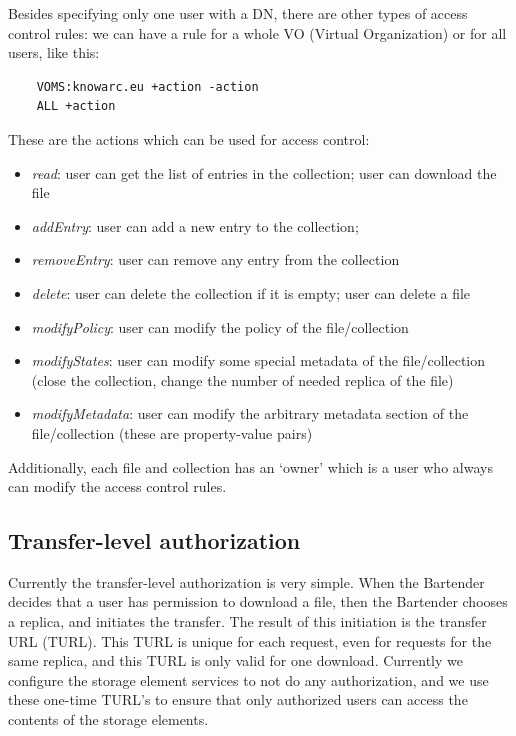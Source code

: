 \documentclass{book}
\begin{document}
Besides specifying only one user with a DN, there are other types of access control rules: we can have a rule for a whole VO (Virtual Organization) or for all users, like this:

\begin{verbatim}
    VOMS:knowarc.eu +action -action 
    ALL +action
\end{verbatim}

These are the actions which can be used for access control:
\begin{itemize}
    \item \emph{read}: user can get the list of entries in the collection; user can download the file
    \item \emph{addEntry}: user can add a new entry to the collection;
    \item \emph{removeEntry}: user can remove any entry from the collection 
    \item \emph{delete}: user can delete the collection if it is empty; user can delete a file
    \item \emph{modifyPolicy}: user can modify the policy of the file/collection
    \item \emph{modifyStates}: user can modify some special metadata of the file/collection (close the collection, change the number of needed replica of the file)
    \item \emph{modifyMetadata}: user can modify the arbitrary metadata section of the file/collection (these are property-value pairs)
\end{itemize}

Additionally, each file and collection has an `owner' which is a user who always can modify the access control rules.



\subsection{Transfer-level authorization} %
\label{sub:transfer_level_authorization}

Currently the transfer-level authorization is very simple. When the Bartender decides that a user has permission to download a file, then the Bartender chooses a replica, and initiates the transfer. The result of this initiation is the transfer URL (TURL). This TURL is unique for each request, even for requests for the same replica, and this TURL is only valid for one download. Currently we configure the storage element services to not do any authorization, and we use these one-time TURL's to ensure that only authorized users can access the contents of the storage elements. 
\end{document}
